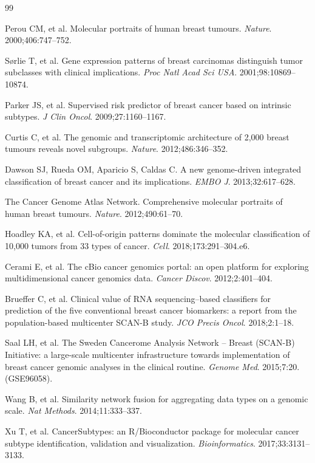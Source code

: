\documentclass[11pt,a4paper]{article}
\begin{document}
\begin{thebibliography}{99}

Perou CM, et al. Molecular portraits of human breast tumours. \textit{Nature}. 2000;406:747--752.

S{\o}rlie T, et al. Gene expression patterns of breast carcinomas distinguish tumor subclasses with clinical implications. \textit{Proc Natl Acad Sci USA}. 2001;98:10869--10874.

Parker JS, et al. Supervised risk predictor of breast cancer based on intrinsic subtypes. \textit{J Clin Oncol}. 2009;27:1160--1167.

Curtis C, et al. The genomic and transcriptomic architecture of 2,000 breast tumours reveals novel subgroups. \textit{Nature}. 2012;486:346--352.

Dawson SJ, Rueda OM, Aparicio S, Caldas C. A new genome-driven integrated classification of breast cancer and its implications. \textit{EMBO J}. 2013;32:617--628.

The Cancer Genome Atlas Network. Comprehensive molecular portraits of human breast tumours. \textit{Nature}. 2012;490:61--70.

Hoadley KA, et al. Cell-of-origin patterns dominate the molecular classification of 10,000 tumors from 33 types of cancer. \textit{Cell}. 2018;173:291--304.e6.

Cerami E, et al. The cBio cancer genomics portal: an open platform for exploring multidimensional cancer genomics data. \textit{Cancer Discov}. 2012;2:401--404.

Brueffer C, et al. Clinical value of RNA sequencing--based classifiers for prediction of the five conventional breast cancer biomarkers: a report from the population-based multicenter SCAN-B study. \textit{JCO Precis Oncol}. 2018;2:1--18.

Saal LH, et al. The Sweden Cancerome Analysis Network -- Breast (SCAN-B) Initiative: a large-scale multicenter infrastructure towards implementation of breast cancer genomic analyses in the clinical routine. \textit{Genome Med}. 2015;7:20. (GSE96058).

Wang B, et al. Similarity network fusion for aggregating data types on a genomic scale. \textit{Nat Methods}. 2014;11:333--337.

Xu T, et al. CancerSubtypes: an R/Bioconductor package for molecular cancer subtype identification, validation and visualization. \textit{Bioinformatics}. 2017;33:3131--3133.


\end{thebibliography}
\end{document}
